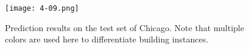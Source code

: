 \begin{figure}[!h]
	\centering
	\texttt{[image: 4-09.png]}
    \caption[Prediction results on the test set of Chicago]{Prediction results on the test set of Chicago. Note that multiple colors are used here to differentiate building instances.}
	\label{fig:finalch}
\end{figure}